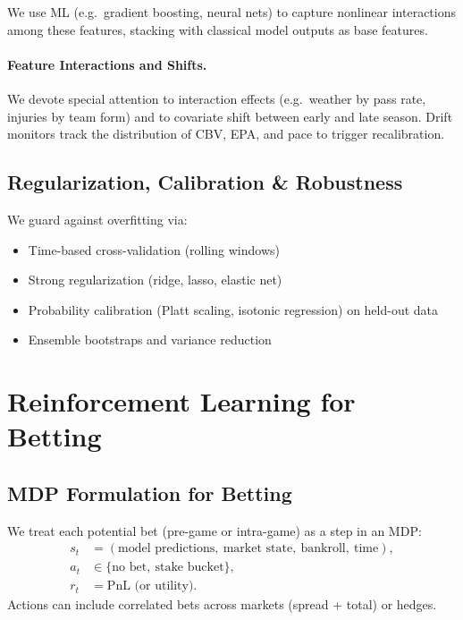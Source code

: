 We use ML (e.g.\ gradient boosting, neural nets) to capture nonlinear interactions among these features, stacking with classical model outputs as base features.

\paragraph{Feature Interactions and Shifts.}
We devote special attention to interaction effects (e.g.\ weather by pass rate, injuries by team form) and to covariate shift between early and late season. Drift monitors track the distribution of CBV, EPA, and pace to trigger recalibration.

\subsection{Regularization, Calibration \& Robustness}
We guard against overfitting via:
\begin{itemize}
  \item Time-based cross-validation (rolling windows)
  \item Strong regularization (ridge, lasso, elastic net)
  \item Probability calibration (Platt scaling, isotonic regression) on held-out data
  \item Ensemble bootstraps and variance reduction
\end{itemize}

\section{Reinforcement Learning for Betting}
\label{sec:rl}

\subsection{MDP Formulation for Betting}
We treat each potential bet (pre-game or intra-game) as a step in an MDP:
\[
\begin{aligned}
s_t &= (\text{model predictions},\ \text{market state},\ \text{bankroll},\ \text{time}),\\
a_t &\in \{\text{no bet},\ \text{stake bucket}\},\\
r_t &= \text{PnL (or utility)}.
\end{aligned}
\]
Actions can include correlated bets across markets (spread + total) or hedges.

